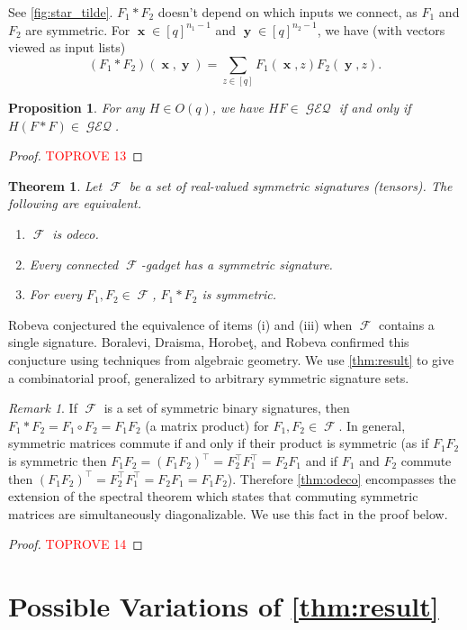\documentclass{article}
\newtheorem{theorem}{Theorem}[section]
\newtheorem{proposition}{Proposition}[section]
\theoremstyle{remark}
\newtheorem{remark}{Remark}[section]
\theoremstyle{definition}
\DeclareMathOperator{\vx}{\mathbf{x}}
\DeclareMathOperator{\vy}{\mathbf{y}}
\DeclareMathOperator{\fc}{\mathcal{F}}
\DeclareMathOperator{\geneq}{\mathcal{GEQ}}
\begin{document}
See \autoref{fig:star_tilde}.
$F_1 * F_2$ doesn't depend on which inputs we connect, as $F_1$ and $F_2$ are symmetric.
For $\vx \in [q]^{n_1-1}$ and $\vy \in [q]^{n_2-1}$, we have (with vectors viewed as input lists)
\[
    (F_1 * F_2)(\vx,\vy) = \sum_{z \in [q]} F_1(\vx,z) F_2(\vy,z).
\]
\begin{proposition}
    \label{prop:odeco}
    For any $H \in O(q)$, we have
    $HF \in \geneq$ if and only if $H(F * F) \in \geneq$. 
\end{proposition}
\begin{proof}\textcolor{red}{TOPROVE 13}\end{proof}
\begin{theorem}
    \label{thm:odeco}
    Let $\fc$ be a set of real-valued symmetric signatures (tensors). The following are equivalent.
    \begin{enumerate}[label=(\roman*)]
        \item $\fc$ is odeco.
        \item Every connected $\fc$-gadget has a symmetric signature.
        \item For every $F_1,F_2 \in \fc$, $F_1 * F_2$ is symmetric.
    \end{enumerate}
\end{theorem}
Robeva \cite{robeva} conjectured the equivalence of items (i) and (iii) when $\fc$
contains a single signature.
Boralevi, Draisma, Horobeţ, and Robeva \cite{boralevi_orthogonal_2017} confirmed this conjucture
using techniques from algebraic geometry.
We use \autoref{thm:result} to give a combinatorial proof, generalized to arbitrary symmetric
signature sets.
\begin{remark}
    If $\fc$ is a set of symmetric binary signatures, then $F_1 * F_2 = F_1 \circ F_2 = F_1F_2$
    (a matrix product) for $F_1,F_2 \in \fc$. In general, symmetric matrices commute if and only
    if their product is symmetric (as if $F_1F_2$ is symmetric then $F_1F_2 = (F_1F_2)^\top = F_2^\top
    F_1^\top = F_2F_1$ and if $F_1$ and $F_2$ commute then $(F_1F_2)^\top = F_2^\top F_1^\top = F_2F_1 = F_1F_2$).
    Therefore \autoref{thm:odeco} encompasses the extension of the spectral theorem
    which states that commuting symmetric matrices are simultaneously diagonalizable. We use this
    fact in the proof below.
    \label{rem:spectral}
\end{remark}
\begin{proof}\textcolor{red}{TOPROVE 14}\end{proof}
 \section{Possible Variations of \autoref{thm:result}}
\label{sec:variations}
\end{document}
